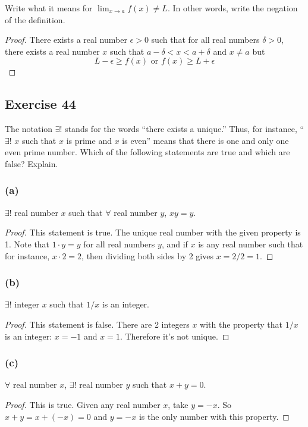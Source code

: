 \documentclass[14pt]{extarticle}
\newcommand{\fa}{\forall}
\newcommand{\te}{\exists}
\begin{document}
Write what it means for $\lim_{x \to a} f(x) \neq L$. In other words, write the negation of the definition.

\begin{proof}
There exists a real number $\epsilon > 0$ such that for all real numbers $\delta > 0$, there exists a real number $x$ such that $a - \delta < x < a + \delta$ and $x \neq a$ but 
$$
L - \epsilon \geq f(x) \text{  or  } f(x) \geq L + \epsilon
$$
\end{proof}

\subsection{Exercise 44}
The notation $\te$! stands for the words “there exists a unique.” Thus, for instance, “$\te$! $x$ such that $x$ is prime and $x$ is even” means that there is one and only one even prime number. Which of the following statements are true and which are false? Explain.

\subsubsection{(a)}
$\te$! real number $x$ such that $\fa$ real number $y$, $xy = y$.

\begin{proof}
This statement is true. The unique real number with the given property is 1. Note that $1\cdot y = y$ for all real numbers $y$, and if $x$ is any real number such that for instance, $x\cdot 2 = 2$, then dividing both sides by 2 gives $x = 2/2 = 1$.
\end{proof}

\subsubsection{(b)}
$\te$! integer $x$ such that $1/x$ is an integer.

\begin{proof}
This statement is false. There are 2 integers $x$ with the property that $1/x$ is an integer: $x = -1$ and $x = 1$. Therefore it's not unique.
\end{proof}

\subsubsection{(c)}
$\fa$ real number $x$, $\te$! real number $y$ such that $x + y = 0$.

\begin{proof}
This is true. Given any real number $x$, take $y = -x$. So $x + y = x + (-x) = 0$ and $y = -x$ is the only number with this property.
\end{proof}
\end{document}
